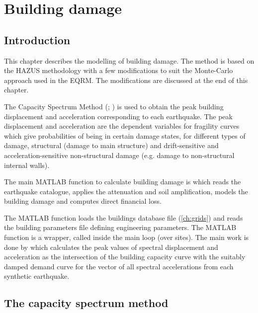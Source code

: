 \chapter{Building damage}
\label{ch:damage}

\section{Introduction}
\label{sec:v-dam-intro}

This chapter describes the modelling of building damage. The
method is based on the HAZUS methodology \citep{dr_FEMA99b} with a
few modifications to suit the Monte-Carlo approach used in the
EQRM. The modifications are discussed at the end of this chapter.

The Capacity Spectrum Method
(\citealp{dr_FEMA99b}; \citealp{dr_Kircher97a}) is used to obtain
the peak building displacement and acceleration corresponding to
each earthquake. The peak displacement
and acceleration are the dependent variables for fragility
curves \citep{dr_Kircher97a} which give
probabilities of being in certain damage states, for different
types of damage, structural (damage to main structure) and
drift-sensitive and acceleration-sensitive non-structural damage
(e.g. damage to non-structural internal walls).

The main MATLAB function to calculate building damage is
 which reads the earthquake catalogue,
applies the attenuation and soil amplification, models the
building damage and computes direct financial loss.

The MATLAB function  loads the buildings
database file (\cref{ch:grids}) and
 reads the building parameters
file defining engineering parameters. The MATLAB function
 is a wrapper, called inside the
main loop (over sites). The main work is done by
 which calculates the peak
values of spectral displacement and acceleration as the
intersection of the building capacity curve
with the suitably damped demand curve for the
vector of all spectral accelerations from each synthetic
earthquake.

\section{The capacity spectrum method}
\label{sec:v-dam-capspect}

